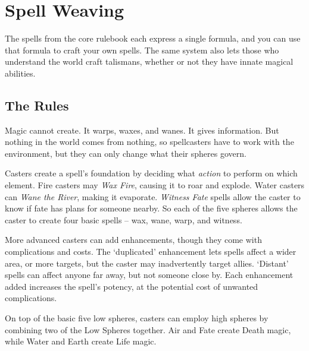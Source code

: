 \chapter{Spell Weaving}

The spells from the core rulebook each express a single formula, and you can use that formula to craft your own spells.
The same system also lets those who understand the world craft \glspl{talisman}, whether or not they have innate magical abilities.

{
  \centering
  \speltagram
  \label{speltagram}
}

\section{The Rules}

\begin{multicols}{2}

\noindent
Magic cannot create.
It warps, waxes, and wanes.
It gives information.
But nothing in the world comes from nothing, so spellcasters have to work with the environment, but they can only change what their spheres govern.

Casters create a spell's foundation by deciding what \emph{action} to perform on which element.
Fire casters may \textit{Wax Fire}, causing it to roar and explode.
Water casters can \textit{Wane the River}, making it evaporate.
\textit{Witness Fate} spells allow the caster to know if fate has plans for someone nearby.
So each of the five spheres allows the caster to create four basic spells -- wax, wane, warp, and witness.

More advanced casters can add enhancements, though they come with complications and costs.
The `duplicated' enhancement lets spells affect a wider area, or more targets, but the caster may inadvertently target allies.
`Distant' spells can affect anyone far away, but not someone close by.
Each enhancement added increases the spell's potency, at the potential cost of unwanted complications.

On top of the basic five low spheres, casters can employ high spheres by combining two of the Low Spheres together.
Air and Fate create Death magic, while Water and Earth create Life magic.


\end{multicols}
